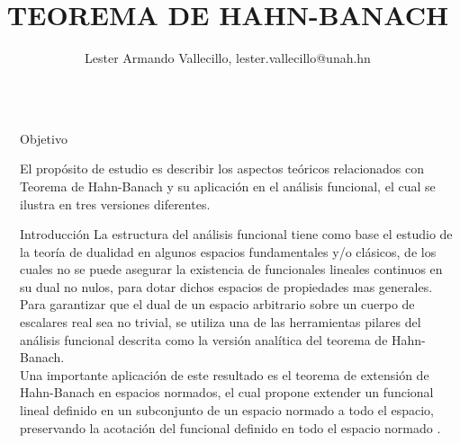 \documentclass[24pt,final]{beamer}
\title{TEOREMA DE HAHN-BANACH} %
\author{Lester Armando Vallecillo, lester.vallecillo@unah.hn} %
\institute{Carrera de Matemáticas, Universidad Nacional Autónoma de Honduras} %
\newlength{\sepwid}
\newlength{\onecolwid}
\begin{document}
\setlength{\belowcaptionskip}{2ex} %
\setlength\belowdisplayshortskip{2ex} %
\begin{frame}[t] %
\begin{columns}[t] %
\begin{column}{\sepwid}\end{column} %
\begin{column}{\onecolwid} %


\begin{alertblock}{Objetivo}

El propósito de estudio es describir los aspectos teóricos relacionados con Teorema de Hahn-Banach y su aplicación en el análisis funcional, el cual se ilustra en tres versiones diferentes.

\end{alertblock}

\begin{block}{Introducción}
La estructura del análisis funcional tiene como base el estudio de la teoría de dualidad en algunos espacios fundamentales y/o clásicos, de los cuales no se puede asegurar la existencia de funcionales lineales continuos en su dual no nulos, para dotar dichos espacios de propiedades mas generales.\\[0.7cm]

Para garantizar que el dual de un espacio arbitrario sobre un cuerpo de escalares real sea no trivial, se utiliza una de las herramientas pilares del análisis funcional descrita como la versión analítica del teorema de Hahn-Banach. \\[0.7cm]

Una importante aplicación de este resultado es el teorema de extensión de Hahn-Banach en espacios normados, el cual propone extender un funcional lineal definido en un subconjunto de un espacio normado a todo el espacio,  preservando la acotación del funcional definido en todo el espacio normado  \cite{Cabello:2009qr}. \\[0.7cm]


\end{block}
\end{column}
\end{columns}
\end{frame}
\end{document}
